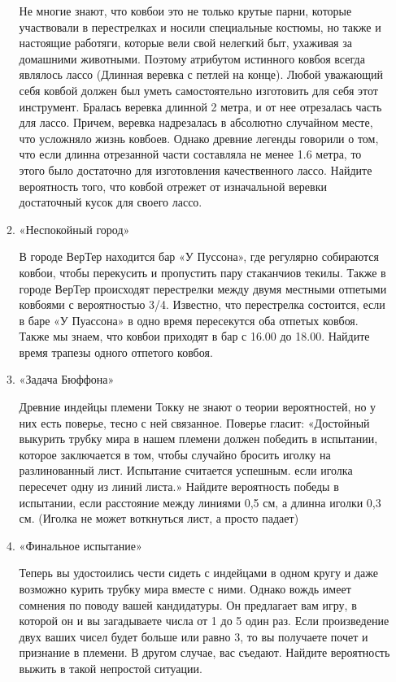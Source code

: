 \documentclass[11pt, a4paper]{article}
\theoremstyle{definition}
\begin{document}
\begin{enumerate}
\begin{enumerate}
    Не многие знают, что ковбои это не только крутые парни, которые участвовали в перестрелках и носили специальные костюмы, но также и настоящие работяги, которые вели свой нелегкий быт, ухаживая за домашними животными. Поэтому атрибутом истинного ковбоя всегда являлось лассо (Длинная веревка с петлей на конце). Любой уважающий себя ковбой должен был уметь самостоятельно изготовить для себя этот инструмент. Бралась веревка длинной 2 метра, и от нее отрезалась часть для лассо. Причем, веревка надрезалась в абсолютно случайном месте, что усложняло жизнь ковбоев. Однако древние легенды говорили о том, что если длинна отрезанной части составляла не менее 1.6 метра, то этого было достаточно для изготовления качественного лассо. Найдите вероятность того, что ковбой отрежет от изначальной веревки достаточный кусок для своего лассо.
    \item «Неспокойный город»
    
    В городе ВерТер находится бар «У Пуссона», где регулярно собираются ковбои, чтобы перекусить и пропустить пару стаканчиов текилы. Также в городе ВерТер происходят перестрелки между двумя местными отпетыми ковбоями с вероятностью 3/4. Известно, что перестрелка состоится, если в баре «У Пуассона» в одно время пересекутся оба отпетых ковбоя. Также мы знаем, что ковбои приходят в бар с 16.00 до 18.00. Найдите время трапезы одного отпетого ковбоя.
    \item «Задача Бюффона»
    
    Древние индейцы племени Токку не знают о теории вероятностей, но у них есть поверье, тесно с ней связанное. Поверье гласит: «Достойный выкурить трубку мира в нашем племени должен победить в испытании, которое заключается в том, чтобы случайно бросить иголку на разлинованный лист. Испытание считается успешным. если иголка пересечет одну из линий листа.» Найдите вероятность победы в испытании, если расстояние между линиями 0,5 см, а длинна иголки 0,3 см. (Иголка не может воткнуться лист, а просто падает)
    \item «Финальное испытание»
    
    Теперь вы удостоились чести сидеть с индейцами в одном кругу и даже возможно курить трубку мира вместе с ними. Однако вождь имеет сомнения по поводу вашей кандидатуры. Он предлагает вам игру, в которой он и вы загадываете числа от 1 до 5 один раз. Если произведение двух ваших чисел будет больше или равно 3, то вы получаете почет и признание в племени. В другом случае, вас съедают. Найдите вероятность выжить в такой непростой ситуации.
    

\end{enumerate}
\end{enumerate}
\end{document}
